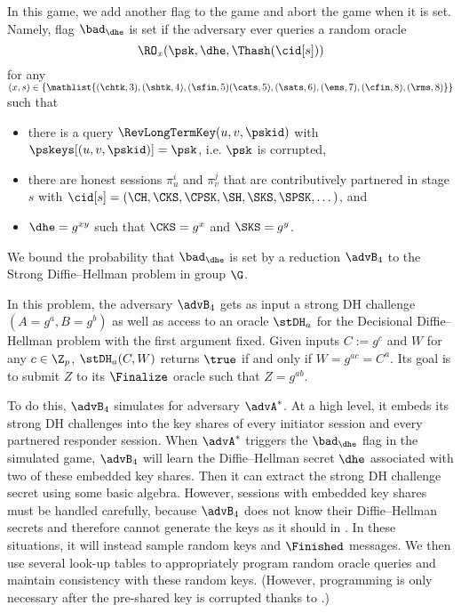 	In this game, we add another flag to the game and abort the game when it is set.
	Namely, flag $\bad_\dhe$ is set if the adversary ever queries a random oracle
	\[
		\RO_x(\psk, \dhe, \Thash(\cid[s]))
	\]
	for any $(x,s) \in \{\mathlist{(\chtk,3), (\shtk,4), (\sfin, 5) (\cats,5), (\sats,6), (\ems,7), (\cfin, 8), (\rms,8)}\}$ such that
	\begin{itemize}
		\item there is a query $\RevLongTermKey(u,v,\pskid)$ with $\pskeys[(u,v,\pskid)] = \psk$, i.e. $\psk$ is corrupted,
		\item there are honest sessions $\pi_u^i$ and $\pi_v^j$ that are contributively partnered in stage $s$ with $\cid[s] = (\CH, \CKS, \CPSK, \SH, \SKS, \SPSK,\dotsc)$, and
		\item $\dhe = g^{xy}$ such that $\CKS = g^x$ and $\SKS = g^y$.
	\end{itemize}

We bound the probability that $\bad_{\dhe}$ is set by a reduction $\advB_4$ to the Strong Diffie--Hellman problem in group $\G$.

In this problem, the adversary $\advB_4$ gets as input a strong DH challenge $(A = g^a, B = g^b)$ as well as access to an oracle $\stDH_a$ for the Decisional Diffie--Hellman problem with the first argument fixed. 
Given inputs $C:=g^c$ and $W$ for any $c \in \Z_p$, $\stDH_a(C, W)$ returns $\true$ if and only if $W = g^{ac} = C^a$.
Its goal is to submit $Z$ to its $\Finalize$ oracle such that $Z = g^{ab}$.

To do this, $\advB_4$ simulates \thisGame for adversary $\advA^*$.
At a high level, it embeds its strong DH challenges into the key shares of every initiator session and every partnered responder session.
When $\advA^*$ triggers the $\bad_{\dhe}$ flag in the simulated game, $\advB_4$ will learn the Diffie--Hellman secret $\dhe$ associated with two of these embedded key shares.
Then it can extract the strong DH challenge secret using some basic algebra.
However, sessions with embedded key shares must be handled carefully, because $\advB_4$ does not know their Diffie--Hellman secrets and therefore cannot generate the keys as it should in \thisGame.
In these situations, it will instead sample random keys and $\Finished$ messages.
We then use several look-up tables to appropriately program random oracle queries and maintain consistency with these random keys.
(However, programming is only necessary after the pre-shared key is corrupted thanks to .)

